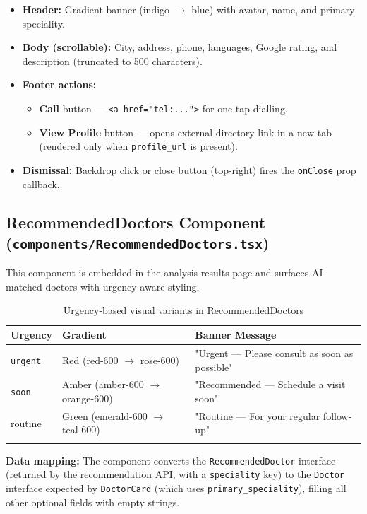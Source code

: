 \documentclass[12pt, a4paper]{article}
\newcommand{\file}[1]{\texttt{\color{accent}#1}}
\begin{document}
\begin{itemize}[leftmargin=*, itemsep=3pt]
  \item \textbf{Header:} Gradient banner (indigo $\to$ blue) with
        avatar, name, and primary speciality.
  \item \textbf{Body (scrollable):} City, address, phone, languages,
        Google rating, and description (truncated to 500 characters).
  \item \textbf{Footer actions:}
    \begin{itemize}
      \item \textbf{Call} button — \texttt{<a href="tel:...">} for
            one-tap dialling.
      \item \textbf{View Profile} button — opens external directory
            link in a new tab (rendered only when
            \texttt{profile\_url} is present).
    \end{itemize}
  \item \textbf{Dismissal:} Backdrop click or close button (top-right)
        fires the \texttt{onClose} prop callback.
\end{itemize}

\subsection{RecommendedDoctors Component (\file{components/RecommendedDoctors.tsx})}

This component is embedded in the analysis results page and surfaces
AI-matched doctors with urgency-aware styling.

\begin{longtable}{p{2.5cm} p{3.5cm} p{7cm}}
  \toprule
  \textbf{Urgency} & \textbf{Gradient} & \textbf{Banner Message} \\
  \midrule
  \texttt{urgent}  & Red (red-600 $\to$ rose-600) & "Urgent — Please consult as soon as possible" \\
  \texttt{soon}    & Amber (amber-600 $\to$ orange-600) & "Recommended — Schedule a visit soon" \\
  routine          & Green (emerald-600 $\to$ teal-600) & "Routine — For your regular follow-up" \\
  \bottomrule
  \caption{Urgency-based visual variants in RecommendedDoctors}
\end{longtable}

\textbf{Data mapping:} The component converts the
\texttt{RecommendedDoctor} interface (returned by the recommendation API,
with a \texttt{speciality} key) to the \texttt{Doctor} interface expected
by \texttt{DoctorCard} (which uses \texttt{primary\_speciality}), filling
all other optional fields with empty strings.
\end{document}
